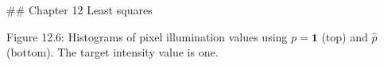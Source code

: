 

## Chapter 12 Least squares

Figure 12.6: Histograms of pixel illumination values using \(p=\mathbf{1}\) (top) and \(\hat{p}\) (bottom). The target intensity value is one.

